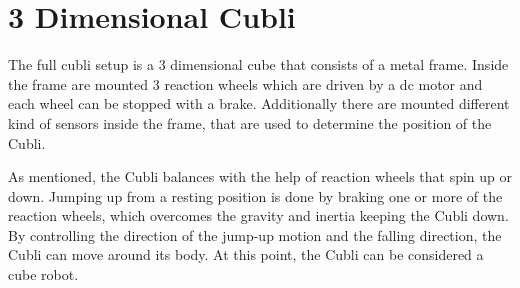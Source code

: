 \section{3 Dimensional Cubli}\label{threeDCubli}
The full cubli setup is a 3 dimensional cube that consists of a metal frame. Inside the frame are mounted 3 reaction wheels which are driven by a dc motor and each wheel can be stopped with a brake. 
Additionally there are mounted different kind of sensors inside the frame, that are used to determine the position of the Cubli.


As mentioned, the Cubli balances with the help of reaction wheels that spin up or down. Jumping up from a resting position is done by braking one or more of the reaction wheels, which overcomes the gravity and inertia keeping the Cubli down.
By controlling the direction of the jump-up motion and the falling direction, the Cubli can move around its body. At this point, the Cubli can be considered a cube robot.\\